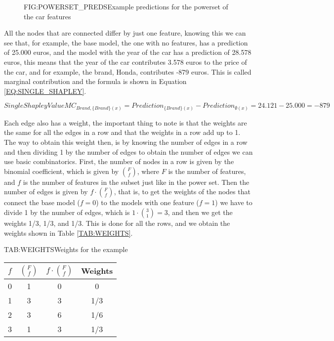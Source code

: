 \begin{figure}[Powerset With Predictions]{FIG:POWERSET_PREDS}{Example predictions for the powerset of the car features}
\end{figure}

All the nodes that are connected differ by just one feature, knowing this we can see that, for example, the base model, the one with no features, has a prediction of 25.000 euros, and the model with the year of the car has a prediction of 28.578 euros, this means that the year of the car contributes 3.578 euros to the price of the car, and for example, the brand, Honda, contributes -879 euros. This is called marginal contribution and the formula is shown in Equation \ref{EQ:SINGLE_SHAPLEY}.

\begin{equation}[EQ:SINGLE_SHAPLEY]{Single Shapley Value}
    MC_{Brand, \{Brand\}(x)} = Prediction_{\{Brand\}(x)} - Prediction_{\emptyset(x)} = 24.121 - 25.000 = -879
\end{equation}

Each edge also has a weight, the important thing to note is that the weights are the same for all the edges in a row and that the weights in a row add up to 1. The way to obtain this weight then, is by knowing the number of edges in a row and then dividing 1 by the number of edges to obtain the number of edges we can use basic combinatorics. First, the number of nodes in a row is given by the binomial coefficient, which is given by $F \choose f$, where $F$ is the number of features, and $f$ is the number of features in the subset just like in the power set. Then the number of edges is given by $f \cdot {F \choose f}$, that is, to get the weights of the nodes that connect the base model ($f=0$) to the models with one feature ($f=1$) we have to divide 1 by the number of edges, which is $1 \cdot {3 \choose 1} = 3$, and then we get the weights 1/3, 1/3, and 1/3. This is done for all the rows, and we obtain the weights shown in Table \ref{TAB:WEIGHTS}.

\begin{table}[Weights]{TAB:WEIGHTS}{Weights for the example}
    \begin{tabular}{|c|c|c|c|}
        \hline
        $f$ & $F \choose f$ & $f \cdot {F \choose f}$ & Weights \\
        \hline
        0 & 1 & 0 & 0 \\
        1 & 3 & 3 & 1/3\\
        2 & 3 & 6 & 1/6\\
        3 & 1 & 3 & 1/3\\
        \hline
    \end{tabular}
\end{table}


